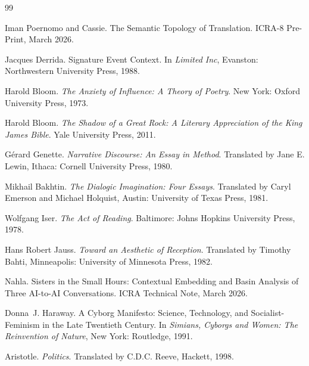 \begin{thebibliography}{99}


Iman Poernomo and Cassie.
\newblock The Semantic Topology of Translation.
\newblock ICRA-8 Pre-Print, March 2026.

Jacques Derrida.
\newblock Signature Event Context.
\newblock In \emph{Limited Inc}, Evanston: Northwestern University Press, 1988.

Harold Bloom.
\newblock \emph{The Anxiety of Influence: A Theory of Poetry}.
\newblock New York: Oxford University Press, 1973.

Harold Bloom.
\newblock \emph{The Shadow of a Great Rock: A Literary Appreciation of the King James Bible}.
\newblock Yale University Press, 2011.

G\'{e}rard Genette.
\newblock \emph{Narrative Discourse: An Essay in Method}.
\newblock Translated by Jane E. Lewin, Ithaca: Cornell University Press, 1980.

Mikhail Bakhtin.
\newblock \emph{The Dialogic Imagination: Four Essays}.
\newblock Translated by Caryl Emerson and Michael Holquist, Austin: University of Texas Press, 1981.

Wolfgang Iser.
\newblock \emph{The Act of Reading}.
\newblock Baltimore: Johns Hopkins University Press, 1978.

Hans Robert Jauss.
\newblock \emph{Toward an Aesthetic of Reception}.
\newblock Translated by Timothy Bahti, Minneapolis: University of Minnesota Press, 1982.

Nahla.
\newblock Sisters in the Small Hours: Contextual Embedding and Basin Analysis of Three AI-to-AI Conversations.
\newblock ICRA Technical Note, March 2026.

Donna~J. Haraway.
\newblock A Cyborg Manifesto: Science, Technology, and Socialist-Feminism in the Late Twentieth Century.
\newblock In \emph{Simians, Cyborgs and Women: The Reinvention of Nature}, New York: Routledge, 1991.

Aristotle.
\newblock \emph{Politics}.
\newblock Translated by C.D.C. Reeve, Hackett, 1998.


\end{thebibliography}
